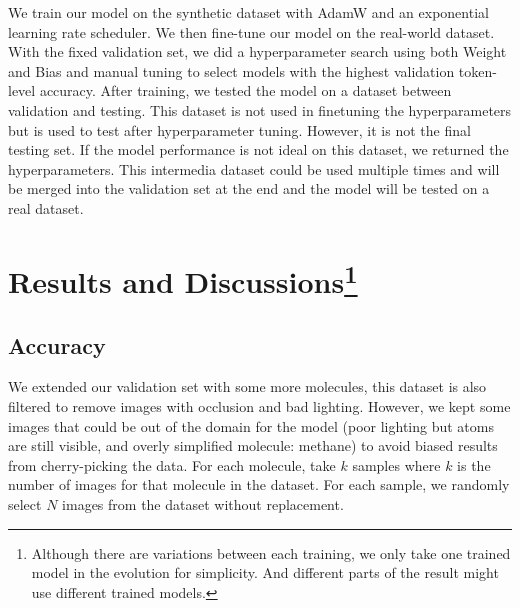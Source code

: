 \documentclass[12pt]{article}
\begin{document}
We train our model on the synthetic dataset with AdamW \autocite{adamw} and an exponential learning rate scheduler. We then fine-tune our model on the real-world dataset. With the fixed validation set, we did a hyperparameter search using both Weight and Bias \autocite{wandb} and manual tuning to select models with the highest validation token-level accuracy.  
After training, we tested the model on a dataset between validation and testing. This dataset is not used in finetuning the hyperparameters but is used to test after hyperparameter tuning. However, it is not the final testing set. If the model performance is not ideal on this dataset, we returned the hyperparameters. This intermedia dataset could be used multiple times and will be merged into the validation set at the end and the model will be tested on a real dataset.
\section[Results and Discussions]{Results and Discussions\footnote{Although there are variations between each training, we only take one trained model in the evolution for simplicity. And different parts of the result might use different trained models. }}
\subsection{Accuracy}
We extended our validation set with some more molecules, this dataset is also filtered to remove images with occlusion and bad lighting. However, we kept some images that could be out of the domain for the model (poor lighting but atoms are still visible, and overly simplified molecule: methane) to avoid biased results from cherry-picking the data. For each molecule, take $k$ samples where $k$ is the number of images for that molecule in the dataset. For each sample, we randomly select $N$ images from the dataset without replacement. 
\end{document}
